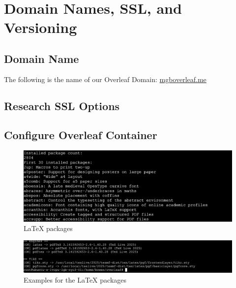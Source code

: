 \chapter{Domain Names, SSL, and Versioning\\
}
\label{Chapter!Domain Names, SSL, and Versioning}

\section{Domain Name}
The following is the name of our Overleaf Domain:
\href{mgboverleaf.me}{mgboverleaf.me}

\section{Research SSL Options}


\section{Configure Overleaf Container}
\begin{figure} [H]
\includegraphics[width=\textwidth]{png/packages.png}
  \centering
  \caption{LaTeX packages}
  \vspace{-0.3cm}
\end{figure}


\begin{figure} [H]
\includegraphics[width=\textwidth]{png/proof.png}
  \centering
  \caption{Examples for the LaTeX packages}
  \vspace{-0.3cm}
\end{figure}



